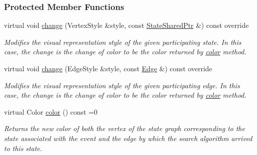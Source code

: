 \subsubsection*{Protected Member Functions}
\begin{DoxyCompactItemize}
\item 
virtual void \hyperlink{structslb_1_1ext_1_1event_1_1VertexEdgeColor_aa84210e4f0a337424366dab5b4cd99d2}{change} (Vertex\+Style \&style, const \hyperlink{structslb_1_1ext_1_1event_1_1UniformChange_a2e6e9605dcd4df428c03c7637fd0d20d}{State\+Shared\+Ptr} \&) const override\hypertarget{structslb_1_1ext_1_1event_1_1VertexEdgeColor_aa84210e4f0a337424366dab5b4cd99d2}{}\label{structslb_1_1ext_1_1event_1_1VertexEdgeColor_aa84210e4f0a337424366dab5b4cd99d2}

\begin{DoxyCompactList}\small\item\em Modifies the visual representation style of the given participating state. In this case, the change is the change of color to be the color returned by \hyperlink{structslb_1_1ext_1_1event_1_1VertexEdgeColor_ac5d0c212a4e807eccbc7082b8834ef77}{color} method. \end{DoxyCompactList}\item 
virtual void \hyperlink{structslb_1_1ext_1_1event_1_1VertexEdgeColor_a81f7ebea1421bed4cc44cce65e7bc873}{change} (Edge\+Style \&style, const \hyperlink{structslb_1_1ext_1_1event_1_1UniformChange_a7ea26ff1c10c84d9bd6002bf5f175f22}{Edge} \&) const override\hypertarget{structslb_1_1ext_1_1event_1_1VertexEdgeColor_a81f7ebea1421bed4cc44cce65e7bc873}{}\label{structslb_1_1ext_1_1event_1_1VertexEdgeColor_a81f7ebea1421bed4cc44cce65e7bc873}

\begin{DoxyCompactList}\small\item\em Modifies the visual representation style of the given participating edge. In this case, the change is the change of color to be the color returned by \hyperlink{structslb_1_1ext_1_1event_1_1VertexEdgeColor_ac5d0c212a4e807eccbc7082b8834ef77}{color} method. \end{DoxyCompactList}\item 
virtual Color \hyperlink{structslb_1_1ext_1_1event_1_1VertexEdgeColor_ac5d0c212a4e807eccbc7082b8834ef77}{color} () const =0
\begin{DoxyCompactList}\small\item\em Returns the new color of both the vertex of the state graph corresponding to the state associated with the event and the edge by which the search algorithm arrived to this state. \end{DoxyCompactList}\end{DoxyCompactItemize}
